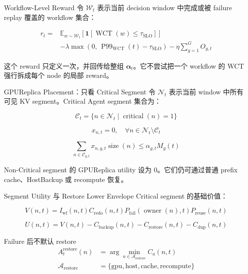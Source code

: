 \documentclass[aspectratio=43]{beamer}
\begin{document}
\begin{frame}{Workflow-Level Reward}
  \small
  令 $\mathcal{W}_t$ 表示当前 decision window 中完成或被 failure replay 覆盖的 workflow 集合：

  \vspace{-0.1cm}
  \begin{align*}
    r_t
    =
    &\mathbb{E}_{w \sim \mathcal{W}_t}
    \left[
      \mathbf{1}\left[
        \operatorname{WCT}(w) \le \tau_{\mathrm{SLO}}
      \right]
    \right] \\
    &-
    \lambda
    \max\left(
      0,\,
      \operatorname{P99}_{\mathrm{WCT}}(t)-\tau_{\mathrm{SLO}}
    \right)
    -
    \eta\sum_{g=1}^{G}O_{g,t}
  \end{align*}

  \footnotesize
  这个 reward 只定义一次，并回传给整组 $\boldsymbol{\alpha}_t$。它不尝试把一个 workflow 的 WCT 强行拆成每个 node 的局部 reward。
\end{frame}

\begin{frame}{GPUReplica Placement：只看 Critical Segment}
  \small
  令 $\mathcal{N}_t$ 表示当前 window 中所有可见 KV segment。Critical Agent segment 集合为：

  \vspace{-0.1cm}
  \[
    \mathcal{C}_t =
    \{n \in \mathcal{N}_t \mid \operatorname{critical}(n)=1\}
  \]

  \[
    x_{n,t}=0,\quad
    \forall n \in \mathcal{N}_t \setminus \mathcal{C}_t
  \]

  \[
    \sum_{n \in \mathcal{C}_{g,t}}
    x_{n,g,t}\operatorname{size}(n)
    \le
    \alpha_{g,t}M_g(t)
  \]

  \footnotesize
  Non-Critical segment 的 GPUReplica utility 设为 0。它们仍可通过普通 prefix cache、HostBackup 或 recompute 恢复。
\end{frame}

\begin{frame}{Segment Utility 与 Restore Lower Envelope}
  \small
  Critical segment 的基础价值：

  \vspace{-0.1cm}
  \[
    V(n,t)
    =
    I_{\mathrm{wf}}(n,t)
    C_{\mathrm{redo}}(n,t)
    P_{\mathrm{fail}}(\operatorname{owner}(n),t)
    P_{\mathrm{reuse}}(n,t)
  \]

  \[
    U(n,t)=
    V(n,t)
    -C_{\mathrm{backup}}(n,t)
    -C_{\mathrm{restore}}(n,t)
    -C_{\mathrm{dup}}(n,t)
  \]

  \begin{block}{Failure 后不默认 restore}
    \[
      \begin{aligned}
        A_t^{\mathrm{restore}}(n)
        &=
        \arg\min_{a \in \mathcal{A}_{\mathrm{restore}}} C_a(n,t) \\
        \mathcal{A}_{\mathrm{restore}}
        &=
        \{\mathrm{gpu},\mathrm{host},\mathrm{cache},\mathrm{recompute}\}
      \end{aligned}
    \]
  \end{block}
\end{frame}
\end{document}
